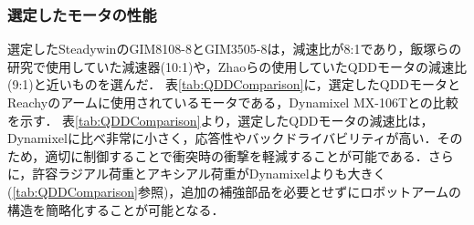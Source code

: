 \subsubsection{選定したモータの性能}
選定したSteadywinのGIM8108-8とGIM3505-8は，減速比が8:1であり，飯塚ら\cite{飯塚浩太2021}の研究で使用していた減速器(10:1)や，Zhaoら\cite{10106520}の使用していたQDDモータの減速比(9:1)と近いものを選んだ．
表\ref{tab:QDDComparison}に，選定したQDDモータとReachy\cite{Reachy:online}のアームに使用されているモータである，Dynamixel MX-106Tとの比較を示す．
表\ref{tab:QDDComparison}より，選定したQDDモータの減速比は，Dynamixelに比べ非常に小さく，応答性やバックドライバビリティが高い．そのため，適切に制御することで衝突時の衝撃を軽減することが可能である．さらに，許容ラジアル荷重とアキシアル荷重がDynamixelよりも大きく(\ref{tab:QDDComparison}参照)，追加の補強部品を必要とせずにロボットアームの構造を簡略化することが可能となる．
